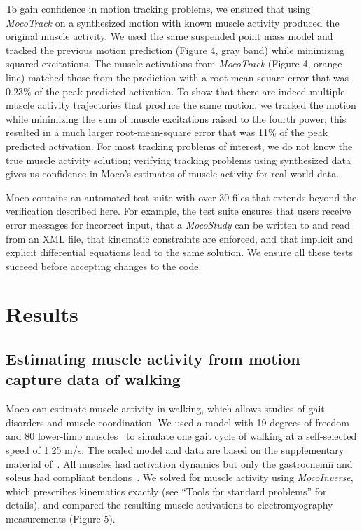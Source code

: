 \documentclass[10pt,letterpaper]{article}
\begin{document}
To gain confidence in motion tracking problems, we ensured that using \textit{MocoTrack} on a synthesized motion with known muscle activity produced the original muscle activity. We used the same suspended point mass model and tracked the previous motion prediction (Figure 4, gray band) while minimizing squared excitations. The muscle activations from \textit{MocoTrack} (Figure 4, orange line) matched those from the prediction with a root-mean-square error that was 0.23\% of the peak predicted activation. To show that there are indeed multiple muscle activity trajectories that produce the same motion, we tracked the motion while minimizing the sum of muscle excitations raised to the fourth power; this resulted in a much larger root-mean-square error that was 11\% of the peak predicted activation. For most tracking problems of interest, we do not know the true muscle activity solution; verifying tracking problems using synthesized data gives us confidence in Moco's estimates of muscle activity for real-world data.

Moco contains an automated test suite with over 30 files that extends beyond the verification described here. For example, the test suite ensures that users receive error messages for incorrect input, that a \textit{MocoStudy} can be written to and read from an XML file, that kinematic constraints are enforced, and that implicit and explicit differential equations lead to the same solution. We ensure all these tests succeed before accepting changes to the code.

\section*{Results}

\subsection*{Estimating muscle activity from motion capture data of walking}

Moco can estimate muscle activity in walking, which allows studies of gait disorders and muscle coordination. We used a model with 19 degrees of freedom and 80 lower-limb muscles~\cite{Rajagopal:2016ek} to simulate one gait cycle of walking at a self-selected speed of 1.25 m/s. The scaled model and data are based on the supplementary material of~\cite{Rajagopal:2016ek}. All muscles had activation dynamics but only the gastrocnemii and soleus had compliant tendons~\cite{Groote:2016dq}. We solved for muscle activity using \textit{MocoInverse}, which prescribes kinematics exactly (see “Tools for standard problems” for details), and compared the resulting muscle activations to electromyography measurements (Figure 5).
\end{document}
